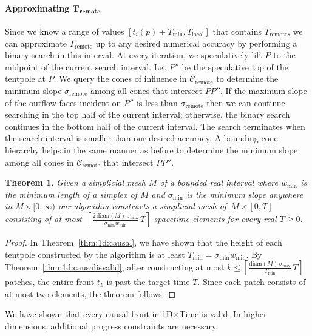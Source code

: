 \documentclass[twocolumn]{article}
\def\minW{\ensuremath{w_{\text{min}}}}
\def\S{\ensuremath{\sigma}}
\def\minS{\ensuremath{\S_{\text{min}}}}
\def\maxS{\ensuremath{\S_{\text{max}}}}
\def\minT{\ensuremath{T_{\text{min}}}}
\def\sp{\ensuremath{M}}
\def\diam{\text{diam}}
\def\fp{\ensuremath{P}}
\def\ceil#1{\ensuremath{\left\lceil{#1}\right\rceil}}
\newtheorem{theorem}[lemma]{Theorem}
\begin{document}
\paragraph{Approximating $\mathbf{T_{\text{remote}}}$}

Since we know a range of values $[t_i(p) + \minT, T_{\text{local}}]$
that contains $T_{\text{remote}}$, we can approximate
$T_{\text{remote}}$ up to any desired numerical accuracy by performing
a binary search in this interval.  At every iteration, we
speculatively lift $\fp$ to the midpoint of the current search
interval.  Let $\fp''$ be the speculative top of the tentpole at
$\fp$.  We query the cones of influence in
$\mathcal{C}_{\text{remote}}$ to determine the minimum slope
$\S_{\text{remote}}$ among all cones that intersect $\fp\fp''$.  If
the maximum slope of the outflow faces incident on $\fp''$ is less
than $\S_{\text{remote}}$ then we can continue searching in the top
half of the current interval; otherwise, the binary search continues
in the bottom half of the current interval.  The search terminates
when the search interval is smaller than our desired accuracy.  A
bounding cone hierarchy helps in the same manner as before to
determine the minimum slope among all cones in
$\mathcal{C}_{\text{remote}}$ that intersect $\fp\fp''$.



\begin{theorem}
  Given a simplicial mesh $\sp$ of a bounded real interval where
  $\minW$ is the minimum length of a simplex of $\sp$ and $\minS$ is
  the minimum slope anywhere in $\sp \times [0,\infty)$ our algorithm
  constructs a simplicial mesh of~$\sp \times [0,T]$ consisting of at
  most~$\ceil{\frac{2 \, \diam(\sp) \, \maxS}{\minS \minW}
    \, T}$ spacetime elements for every real $T \ge 0$.
\label{thm:1d:main}
\end{theorem}
\begin{proof}
  In Theorem~\ref{thm:1d:causal}, we have shown that the height of
  each tentpole constructed by the algorithm is at least $\minT =
  \minS \minW$.  By Theorem~\ref{thm:1d:causalisvalid}, after
  constructing at most $k \le \ceil{\frac{\diam(\sp) \, \maxS}{\minT}
    \, T}$ patches, the entire front $t_k$ is past the target time
  $T$.  Since each patch consists of at most two elements, the theorem
  follows.
\end{proof}


We have shown that every causal front in 1D$\times$Time is valid.  In
higher dimensions, additional progress constraints are necessary.
\end{document}
